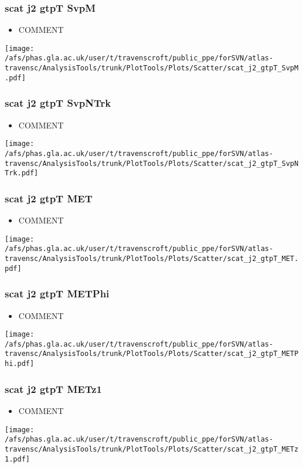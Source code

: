 \documentclass{beamer}
\begin{document}
\begin{frame}
\frametitle{scat j2 gtpT SvpM}
\begin{itemize}
\item COMMENT
\end{itemize}
\begin{center}
\texttt{[image: /afs/phas.gla.ac.uk/user/t/travenscroft/public\_ppe/forSVN/atlas-travensc/AnalysisTools/trunk/PlotTools/Plots/Scatter/scat\_j2\_gtpT\_SvpM.pdf]}
\end{center}
\end{frame}

\begin{frame}
\frametitle{scat j2 gtpT SvpNTrk}
\begin{itemize}
\item COMMENT
\end{itemize}
\begin{center}
\texttt{[image: /afs/phas.gla.ac.uk/user/t/travenscroft/public\_ppe/forSVN/atlas-travensc/AnalysisTools/trunk/PlotTools/Plots/Scatter/scat\_j2\_gtpT\_SvpNTrk.pdf]}
\end{center}
\end{frame}

\begin{frame}
\frametitle{scat j2 gtpT MET}
\begin{itemize}
\item COMMENT
\end{itemize}
\begin{center}
\texttt{[image: /afs/phas.gla.ac.uk/user/t/travenscroft/public\_ppe/forSVN/atlas-travensc/AnalysisTools/trunk/PlotTools/Plots/Scatter/scat\_j2\_gtpT\_MET.pdf]}
\end{center}
\end{frame}

\begin{frame}
\frametitle{scat j2 gtpT METPhi}
\begin{itemize}
\item COMMENT
\end{itemize}
\begin{center}
\texttt{[image: /afs/phas.gla.ac.uk/user/t/travenscroft/public\_ppe/forSVN/atlas-travensc/AnalysisTools/trunk/PlotTools/Plots/Scatter/scat\_j2\_gtpT\_METPhi.pdf]}
\end{center}
\end{frame}

\begin{frame}
\frametitle{scat j2 gtpT METz1}
\begin{itemize}
\item COMMENT
\end{itemize}
\begin{center}
\texttt{[image: /afs/phas.gla.ac.uk/user/t/travenscroft/public\_ppe/forSVN/atlas-travensc/AnalysisTools/trunk/PlotTools/Plots/Scatter/scat\_j2\_gtpT\_METz1.pdf]}
\end{center}
\end{frame}
\end{document}
